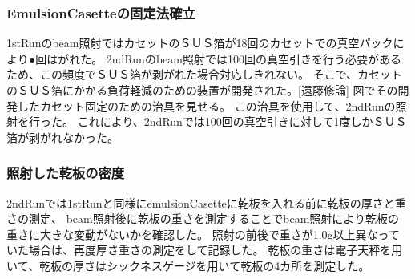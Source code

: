 \documentclass[12pt,a4paper]{jarticle}
\begin{document}
\subsubsection{EmulsionCasetteの固定法確立}
1stRunのbeam照射ではカセットのＳＵＳ箔が18回のカセットでの真空パックにより●回はがれた。
2ndRunのbeam照射では100回の真空引きを行う必要があるため、この頻度でＳＵＳ箔が剥がれた場合対応しきれない。
そこで、カセットのＳＵＳ箔にかかる負荷軽減のための装置が開発された。[遠藤修論]
図でその開発したカセット固定のための治具を見せる。
この治具を使用して、2ndRunの照射を行った。
これにより、2ndRunでは100回の真空引きに対して1度しかＳＵＳ箔が剥がれなかった。
\subsubsection{照射した乾板の密度}
2ndRunでは1stRunと同様にemulsionCasetteに乾板を入れる前に乾板の厚さと重さの測定、
beam照射後に乾板の重さを測定することでbeam照射により乾板の重さに大きな変動がないかを確認した。
照射の前後で重さが1.0g以上異なっていた場合は、再度厚さ重さの測定をして記録した。
乾板の重さは電子天秤を用いて、乾板の厚さはシックネスゲージを用いて乾板の4カ所を測定した。
\end{document}

